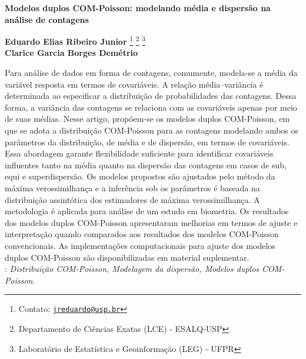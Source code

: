\documentclass[12pt, a4paper]{article}
\begin{document}
\onehalfspacing

\begin{center}
  \textbf{
    \Large{Modelos duplos COM-Poisson: modelando média e dispersão
      na análise de contagens}
  } \\[1em]
\end{center}

\begin{flushright}
  {\bf Eduardo Elias Ribeiro Junior}
  \footnote[$\dagger$]{Contato:
    \href{mailto:jreduardo@usp.br}{\tt jreduardo@usp.br}}
  \footnote[1]{Departamento de Ciências Exatas (LCE) - ESALQ-USP}
  \footnote[2]{Laboratório de Estatística e Geoinformação (LEG) -
    UFPR}\\
  {\bf Clarice Garcia Borges Demétrio} \footnotemark[1]
\end{flushright}

\vspace*{0.5cm}

\noindent Para análise de dados em forma de contagens, comumente,
modela-se a média da variável resposta em termos de covariáveis. A
relação média--variância é determinada ao especificar a distribuição de
probabilidades das contagens. Dessa forma, a variância das contagens se
relaciona com as covariáveis apenas por meio de suas médias. Nesse
artigo, propõem-se os modelos duplos COM-Poisson, em que se adota a
distribuição COM-Poisson para as contagens modelando ambos os
parâmetros da distribuição, de média e de dispersão, em termos de
covariáveis. Essa abordagem garante flexibilidade suficiente para
identificar covariáveis influentes tanto na média quanto na dispersão
das contagens em casos de sub, equi e superdispersão. Os modelos
propostos são ajustados pelo método da máxima verossimilhança e a
inferência sob os parâmetros é baseada na distribuição assintótica dos
estimadores de máxima verossimilhança. A metodologia é aplicada para
análise de um estudo em biometria. Os resultados dos modelos duplos
COM-Poisson apresentaram melhorias em termos de ajuste e interpretação
quando comparados aos resultados dos modelos COM-Poisson
convencionais. As implementações computacionais para ajuste dos modelos
duplos COM-Poisson são disponibilizadas em material
suplementar.\\

:
{\it Distribuição COM-Poisson, Modelagem da dispersão,
     Modelos duplos COM-Poisson}.\\
\end{document}
